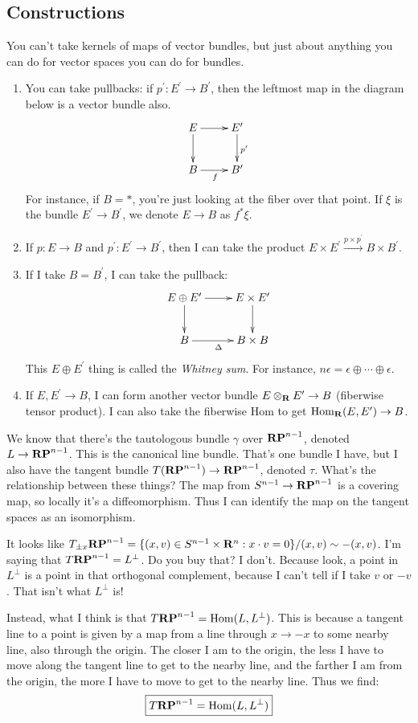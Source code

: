 \subsection{Constructions}
You can't take kernels of maps of vector bundles, but just about anything you can do for vector spaces you can do for bundles.
\begin{enumerate}
    \item You can take pullbacks: if $p^\prime:E^\prime\to B^\prime$, then the leftmost map in the diagram below is a vector bundle also.
	\begin{equation*}
	    \xymatrix{
		E\ar[r]\ar[d] & E^\prime\ar[d]^{p^\prime}\\
		B\ar[r]_f & B^\prime
		}
	\end{equation*}
	For instance, if $B=\ast$, you're just looking at the fiber over that point. If $\xi$ is the bundle $E^\prime\to B^\prime$, we denote $E\to B$ as $f^\ast \xi$.
    \item If $p:E\to B$ and $p^\prime:E^\prime\to B^\prime$, then I can take the product $E\times E^\prime\xrightarrow{p\times p^\prime}B\times B^\prime$. 
    \item If I take $B=B^\prime$, I can take the pullback:
	\begin{equation*}
	    \xymatrix{
		E\oplus E^\prime\ar[r]\ar[d] & E\times E^\prime\ar[d]\\
		B\ar[r]_{\Delta} & B\times B
		}
	\end{equation*}
	This $E\oplus E^\prime$ thing is called the \emph{Whitney sum}. For instance, $n\epsilon = \epsilon\oplus\cdots\oplus\epsilon$.
    \item If $E,E^\prime\to B$, I can form another vector bundle $E\otimes_\mathbf R E^\prime\to B$ (fiberwise tensor product). I can also take the fiberwise Hom to get $\operatorname{Hom}_\mathbf R(E,E^\prime)\to B$.
\end{enumerate}
\begin{example}
    We know that there's the tautologous bundle $\gamma$ over $\mathbf{RP}^{n-1}$, denoted $L\to\mathbf{RP}^{n-1}$. This is the canonical line bundle. That's one bundle I have, but I also have the tangent bundle $T(\mathbf{RP}^{n-1})\to \mathbf{RP}^{n-1}$, denoted $\tau$. What's the relationship between these things? The map from $S^{n-1}\to\mathbf{RP}^{n-1}$ is a covering map, so locally it's a diffeomorphism. Thus I can identify the map on the tangent spaces as an isomorphism.
    
    It looks like $T_{\pm x}\mathbf{RP}^{n-1}=\{(x,v)\in S^{n-1}\times\mathbf R^n: x\cdot v = 0\}/(x,v)\sim-(x,v)$. I'm saying that $T\mathbf{RP}^{n-1} = L^\perp$. Do you buy that? I don't. Because look, a point in $L^\perp$ is a point in that orthogonal complement, because I can't tell if I take $v$ or $-v$. That isn't what $L^\perp$ is!

    Instead, what I think is that $T\mathbf{RP}^{n-1} = \operatorname{Hom}(L,L^\perp)$. This is because a tangent line to a point is given by a map from a line through $x\to -x$ to some nearby line, also through the origin. The closer I am to the origin, the less I have to move along the tangent line to get to the nearby line, and the farther I am from the origin, the more I have to move to get to the nearby line. Thus we find:
    $$\boxed{T\mathbf{RP}^{n-1} = \operatorname{Hom}(L,L^\perp)}$$
\end{example}
